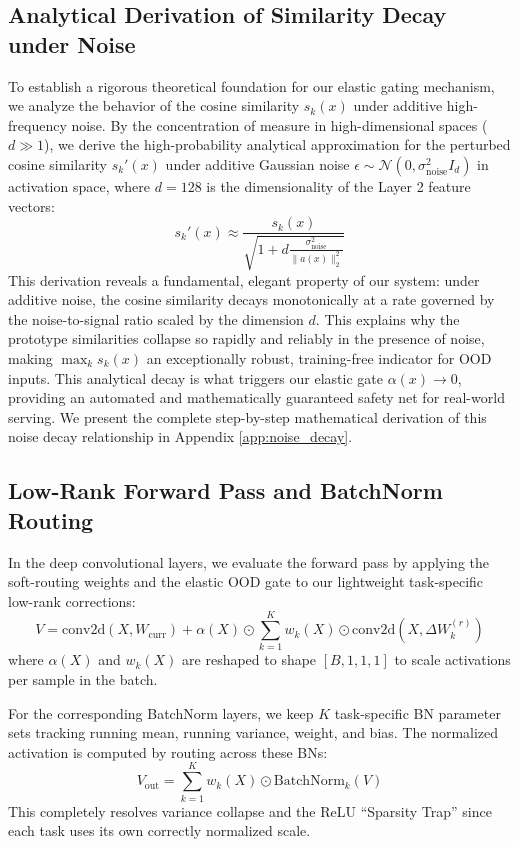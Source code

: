 \documentclass{article}
\theoremstyle{plain}
\theoremstyle{definition}
\theoremstyle{remark}
\begin{document}
\subsection{Analytical Derivation of Similarity Decay under Noise}
To establish a rigorous theoretical foundation for our elastic gating mechanism, we analyze the behavior of the cosine similarity $s_k(x)$ under additive high-frequency noise.
By the concentration of measure in high-dimensional spaces ($d \gg 1$), we derive the high-probability analytical approximation for the perturbed cosine similarity $s_k'(x)$ under additive Gaussian noise $\epsilon \sim \mathcal{N}(0, \sigma_{\text{noise}}^2 I_d)$ in activation space, where $d = 128$ is the dimensionality of the Layer 2 feature vectors:
\begin{equation}
    s_k'(x) \approx \frac{s_k(x)}{\sqrt{1 + d \frac{\sigma_{\text{noise}}^2}{\|a(x)\|_2^2}}}
\end{equation}
This derivation reveals a fundamental, elegant property of our system: under additive noise, the cosine similarity decays monotonically at a rate governed by the noise-to-signal ratio scaled by the dimension $d$. This explains why the prototype similarities collapse so rapidly and reliably in the presence of noise, making $\max_k s_k(x)$ an exceptionally robust, training-free indicator for OOD inputs. This analytical decay is what triggers our elastic gate $\alpha(x) \to 0$, providing an automated and mathematically guaranteed safety net for real-world serving. We present the complete step-by-step mathematical derivation of this noise decay relationship in Appendix \ref{app:noise_decay}.

\subsection{Low-Rank Forward Pass and BatchNorm Routing}
In the deep convolutional layers, we evaluate the forward pass by applying the soft-routing weights and the elastic OOD gate to our lightweight task-specific low-rank corrections:
\begin{equation}
    V = \text{conv2d}(X, W_{\text{curr}}) + \alpha(X) \odot \sum_{k=1}^K w_k(X) \odot \text{conv2d}(X, \Delta W_k^{(r)})
\end{equation}
where $\alpha(X)$ and $w_k(X)$ are reshaped to shape $[B, 1, 1, 1]$ to scale activations per sample in the batch.

For the corresponding BatchNorm layers, we keep $K$ task-specific BN parameter sets tracking running mean, running variance, weight, and bias. The normalized activation is computed by routing across these BNs:
\begin{equation}
    V_{\text{out}} = \sum_{k=1}^K w_k(X) \odot \text{BatchNorm}_k(V)
\end{equation}
This completely resolves variance collapse and the ReLU ``Sparsity Trap'' since each task uses its own correctly normalized scale.
\end{document}
